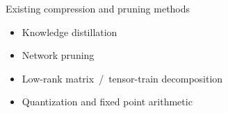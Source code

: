 \documentclass[handout]{beamer}
\begin{document}
\begin{frame}[c]{\insertsection}
  Existing compression and pruning methods
  \begin{itemize}
    \item Knowledge distillation\textsuperscript{
        \citep{hinton_distilling_2015,balasubramanian_deep_2016}}

    \smallskip
    \item Network pruning\textsuperscript{
        \citep{lecun_optimal_1990,seide_conversational_2011,zhu_prune_2018}}

    \smallskip
    \item Low-rank matrix~/~tensor-train decomposition\textsuperscript{
        \citep{denton_exploiting_2014,novikov_tensorizing_2015}}

    \smallskip
    \item Quantization and fixed point arithmetic\textsuperscript{
        \citep{courbariaux_training_2015,han_deep_2016,chen_fxpnet_2017}}
  \end{itemize}


\end{frame}
\end{document}
